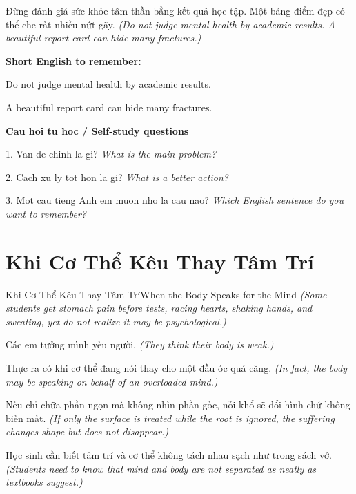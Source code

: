 \begin{baihoc}
Đừng đánh giá sức khỏe tâm thần bằng kết quả học tập. Một bảng điểm đẹp có thể che rất nhiều nứt gãy.
\textit{(Do not judge mental health by academic results. A beautiful report card can hide many fractures.)}
\end{baihoc}

\begin{ghinhoanh}
\textbf{Short English to remember:}

Do not judge mental health by academic results.

A beautiful report card can hide many fractures.

\end{ghinhoanh}

\begin{tuhocnhanh}
\textbf{Cau hoi tu hoc / Self-study questions}

1. Van de chinh la gi? \textit{What is the main problem?}

2. Cach xu ly tot hon la gi? \textit{What is a better action?}

3. Mot cau tieng Anh em muon nho la cau nao? \textit{Which English sentence do you want to remember?}
\end{tuhocnhanh}
\ngancach

\section{Khi Cơ Thể Kêu Thay Tâm Trí}
\begin{truyen}{Khi Cơ Thể Kêu Thay Tâm Trí}{When the Body Speaks for the Mind}
\textit{(Some students get stomach pain before tests, racing hearts, shaking hands, and sweating, yet do not realize it may be psychological.)}

Các em tưởng mình yếu người.
\textit{(They think their body is weak.)}

Thực ra có khi cơ thể đang nói thay cho một đầu óc quá căng.
\textit{(In fact, the body may be speaking on behalf of an overloaded mind.)}

Nếu chỉ chữa phần ngọn mà không nhìn phần gốc, nỗi khổ sẽ đổi hình chứ không biến mất.
\textit{(If only the surface is treated while the root is ignored, the suffering changes shape but does not disappear.)}

Học sinh cần biết tâm trí và cơ thể không tách nhau sạch như trong sách vở.
\textit{(Students need to know that mind and body are not separated as neatly as textbooks suggest.)}

\end{truyen}


